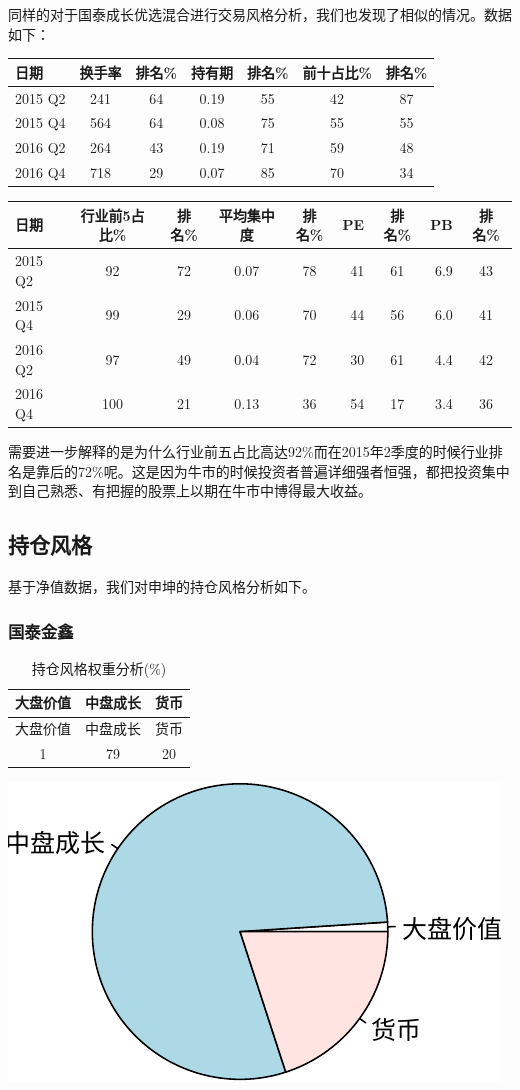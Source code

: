 \documentclass[hyperref,]{ctexart}
\begin{document}
同样的对于国泰成长优选混合进行交易风格分析，我们也发现了相似的情况。数据如下：

\begin{longtable}[]{@{}lcccccc@{}}
\toprule
日期 & 换手率 & 排名\% & 持有期 & 排名\% & 前十占比\% &
排名\%\tabularnewline
\midrule
\endhead
2015 Q2 & 241 & 64 & 0.19 & 55 & 42 & 87\tabularnewline
2015 Q4 & 564 & 64 & 0.08 & 75 & 55 & 55\tabularnewline
2016 Q2 & 264 & 43 & 0.19 & 71 & 59 & 48\tabularnewline
2016 Q4 & 718 & 29 & 0.07 & 85 & 70 & 34\tabularnewline
\bottomrule
\end{longtable}

\begin{longtable}[]{@{}lccccrcrc@{}}
\toprule
日期 & 行业前5占比\% & 排名\% & 平均集中度 & 排名\% & PE & 排名\% & PB &
排名\%\tabularnewline
\midrule
\endhead
2015 Q2 & 92 & 72 & 0.07 & 78 & 41 & 61 & 6.9 & 43\tabularnewline
2015 Q4 & 99 & 29 & 0.06 & 70 & 44 & 56 & 6.0 & 41\tabularnewline
2016 Q2 & 97 & 49 & 0.04 & 72 & 30 & 61 & 4.4 & 42\tabularnewline
2016 Q4 & 100 & 21 & 0.13 & 36 & 54 & 17 & 3.4 & 36\tabularnewline
\bottomrule
\end{longtable}

需要进一步解释的是为什么行业前五占比高达92\%而在2015年2季度的时候行业排名是靠后的72\%呢。这是因为牛市的时候投资者普遍详细强者恒强，都把投资集中到自己熟悉、有把握的股票上以期在牛市中博得最大收益。

\subsection{持仓风格}

基于净值数据，我们对申坤的持仓风格分析如下。

\subsubsection{国泰金鑫}\label{-1}

\begin{longtable}[]{@{}ccc@{}}
\caption{持仓风格权重分析(\%)}\tabularnewline
\toprule
大盘价值 & 中盘成长 & 货币\tabularnewline
\midrule
\endfirsthead
\toprule
大盘价值 & 中盘成长 & 货币\tabularnewline
\midrule
\endhead
1 & 79 & 20\tabularnewline
\bottomrule
\end{longtable}

\includegraphics{shenkun-details_files/figure-latex/unnamed-chunk-8-1.pdf}
\end{document}
